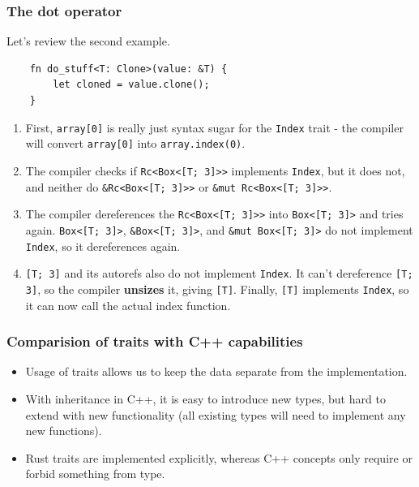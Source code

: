\documentclass[aspectratio=1610,t]{beamer}
\begin{document}

\begin{frame}[fragile]
\frametitle{The dot operator}
Let's review the second example.

\begin{verbatim}
    fn do_stuff<T: Clone>(value: &T) {
        let cloned = value.clone();
    }
\end{verbatim}

\begin{enumerate}
    \item<2-> First, \texttt{array[0]} is really just syntax sugar for the \texttt{Index} trait - the compiler will convert \texttt{array[0]} into \texttt{array.index(0)}.
    \item<3-> The compiler checks if \texttt{Rc<Box<[T; 3]>>} implements \texttt{Index}, but it does not, and neither do \texttt{\&Rc<Box<[T; 3]>>} or \texttt{\&mut Rc<Box<[T; 3]>>}.
    \item<4-> The compiler dereferences the \texttt{Rc<Box<[T; 3]>>} into \texttt{Box<[T; 3]>} and tries again. \texttt{Box<[T; 3]>}, \texttt{\&Box<[T; 3]>}, and \texttt{\&mut Box<[T; 3]>} do not implement \texttt{Index}, so it dereferences again.
    \item<5-> \texttt{[T; 3]} and its autorefs also do not implement \texttt{Index}. It can't dereference \texttt{[T; 3]}, so the compiler \textbf{unsizes} it, giving \texttt{[T]}. Finally, \texttt{[T]} implements \texttt{Index}, so it can now call the actual index function.
\end{enumerate}
\end{frame}


\begin{frame}[fragile]
\frametitle{Comparision of traits with C++ capabilities}
\begin{itemize}
    \item<1-> Usage of traits allows us to keep the data separate from the implementation.
    \item<2-> With inheritance in C++, it is easy to introduce new types, but hard to extend with new functionality (all existing types will need to implement any new functions).
    \item<3-> Rust traits are implemented explicitly, whereas C++ concepts only require or forbid something from type.
\end{itemize}
\end{frame}
\end{document}
